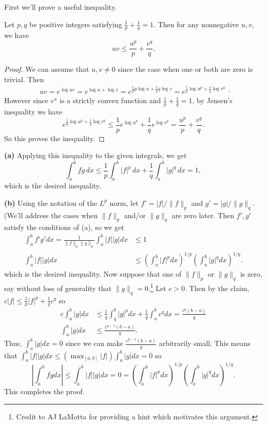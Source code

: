 \documentclass[11pt,letterpaper]{article}
\begin{document}
\begin{solution}
    First we'll prove a useful inequality.

    \begin{claim}
        Let $p,q$ be positive integers satisfying $\frac{1}{p}+\frac{1}{q}=1$. Then for any nonnegative $u,v$, we have
        \[
            uv\leq \frac{u^p}{p}+\frac{v^q}{q}
        .\] 
    \end{claim}
    \begin{proof}
        We can assume that $u,v\neq 0$ since the case when one or both are zero is trivial. Then
        \[
            \begin{aligned}
                uv = e^{\log uv} = e^{\log u + \log v} = e^{\frac{1}{p}p\log u+\frac{1}{q}q\log v}=e^{\frac{1}{p}\log u^p + \frac{1}{q} \log v^q}
            \end{aligned}
        .\] 
        However since $e^x$ is a strictly convex function and $\frac{1}{p}+\frac{1}{q}=1$, by Jensen's inequality we have 
        \[
            e^{\frac{1}{p}\log u^p+\frac{1}{q}\log v^q} \leq \frac{1}{p}e^{\log u^p}+\frac{1}{q}e^{\log v^q}=\frac{u^p}{p}+\frac{v^{q}}{q}
        .\] 
        So this proves the inequality.
    \end{proof}

    \textbf{(a)} Applying this inequality to the given integrals, we get
    \[
        \int_a^b fg\, dx \leq \frac{1}{p}\int_a^b |f|^p\,dx + \frac{1}{q}\int_a^b |g|^q\,dx=1
    ,\]
    which is the desired inequality.
    
    \textbf{(b)} Using the notation of the $L^p$ norm, let $f' = |f|/\|f\|_p$ and $g' = |g|/\|g\|_q$. (We'll address the cases when $\|f\|_p$ and/or $\|g\|_q$ are zero later. Then $f', g'$ satisfy the conditions of (a), so we get
    \[
        \begin{aligned}
            \int^b_a f'g' dx = \frac{1}{\|f\|_p\|g\|_q}\int^b_a |f||g| dx &\leq 1\\
            \int^b_a |f||g| dx &\leq \left(\int^b_a |f|^p dx\right)^{1/p}\left(\int^b_a |g|^q dx\right)^{1 /q}.
        \end{aligned}
    \]   
    which is the desired inequality. Now suppose that one of $\|f\|_p$ or $\|g\|_q$ is zero, say without loss of generality that $\|g\|_q=0$.\footnote{Credit to AJ LaMotta for providing a hint which motivates this argument.} Let $c >0$. Then by the claim, $c|f| \leq \frac{1}{p}|f|^p+\frac{1}{q}c^q$ so 
    \[
        \begin{aligned}
            c\int^b_a |g| dx &\leq \frac{1}{q}\int^b_q|g|^p dx + \frac{1}{q}\int^b_a c^q dx = \frac{c^q(b-a)}{q}\\
            \int^b_a |g| dx &\leq \frac{c^{q-1}(b-a)}{q}.
        \end{aligned}
    \]  
    Thus, $\int^b_a |g| dx = 0$ since we can make $\frac{c^{q-1}(b-a)}{q}$ arbitrarily small. This means that $\int^b_a |f||g| dx \leq (\max_{[a,b]} |f|)\int^b_a |g| dx = 0$ so
    \[
        \left|\int^b_a fg dx\right|\leq \int^b_a |f||g|dx = 0 = \left(\int^b_a |f|^p dx\right)^{1/p}\left(\int^b_a |g|^q dx\right)^{1 /q}
    .\]  
    This completes the proof.
\end{solution}
\end{document}
